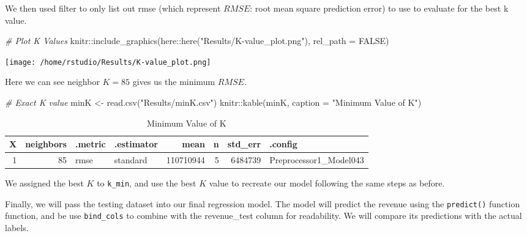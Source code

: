 \documentclass[
]{article}
\newenvironment{Shaded}{\begin{snugshade}}{\end{snugshade}}
\newcommand{\AttributeTok}[1]{\textcolor[rgb]{0.77,0.63,0.00}{#1}}
\newcommand{\CommentTok}[1]{\textcolor[rgb]{0.56,0.35,0.01}{\textit{#1}}}
\newcommand{\ConstantTok}[1]{\textcolor[rgb]{0.00,0.00,0.00}{#1}}
\newcommand{\FunctionTok}[1]{\textcolor[rgb]{0.00,0.00,0.00}{#1}}
\newcommand{\NormalTok}[1]{#1}
\newcommand{\OtherTok}[1]{\textcolor[rgb]{0.56,0.35,0.01}{#1}}
\newcommand{\SpecialCharTok}[1]{\textcolor[rgb]{0.00,0.00,0.00}{#1}}
\newcommand{\StringTok}[1]{\textcolor[rgb]{0.31,0.60,0.02}{#1}}
\begin{document}
We then used filter to only list out rmse (which represent \(RMSE\): root mean square prediction error) to use to evaluate for the best k value.

\begin{Shaded}
\begin{Highlighting}[]
\CommentTok{\# Plot K Values}
\NormalTok{knitr}\SpecialCharTok{::}\FunctionTok{include\_graphics}\NormalTok{(here}\SpecialCharTok{::}\FunctionTok{here}\NormalTok{(}\StringTok{"Results/K{-}value\_plot.png"}\NormalTok{), }\AttributeTok{rel\_path =} \ConstantTok{FALSE}\NormalTok{)}
\end{Highlighting}
\end{Shaded}

\texttt{[image: /home/rstudio/Results/K-value\_plot.png]}

Here we can see neighbor \(K = 85\) gives us the minimum \(RMSE\).

\begin{Shaded}
\begin{Highlighting}[]
\CommentTok{\# Exact K value}
\NormalTok{minK }\OtherTok{\textless{}{-}} \FunctionTok{read.csv}\NormalTok{(}\StringTok{"Results/minK.csv"}\NormalTok{)}
\NormalTok{knitr}\SpecialCharTok{::}\FunctionTok{kable}\NormalTok{(minK, }\AttributeTok{caption =} \StringTok{"Minimum Value of K"}\NormalTok{)     }
\end{Highlighting}
\end{Shaded}

\begin{table}

\caption{\label{tab:unnamed-chunk-7}Minimum Value of K}
\centering
\begin{tabular}[t]{r|r|l|l|r|r|r|l}
\hline
X & neighbors & .metric & .estimator & mean & n & std\_err & .config\\
\hline
1 & 85 & rmse & standard & 110710944 & 5 & 6484739 & Preprocessor1\_Model043\\
\hline
\end{tabular}
\end{table}

We assigned the best \(K\) to \texttt{k\_min}, and use the best \(K\) value to recreate our model following the same steps as before.

Finally, we will pass the testing dataset into our final regression model. The model will predict the revenue using the \texttt{predict()} function function, and be use \texttt{bind\_cols} to combine with the revenue\_test column for readability. We will compare its predictions with the actual labels.
\end{document}
